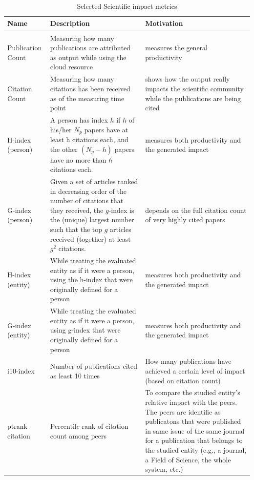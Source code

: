 \documentclass{sig-alternate-05-2015}
\begin{document}
\begin{table}[htb]
\caption{Selected Scientific impact metrics}
\begin{scriptsize}
\label{T:SIMmetrics}
\bigskip
\begin{center}
\begin{tabular}{p{}p{}p{}}
Name & Description & Motivation \\
\hline
\rowcolor{blue!20} \multicolumn{3}{l}{\bf Scientific impact metrics} \\
\hline
Publication Count &
Measuring how many publications are attributed as output while using the cloud 
resource &
measures the general productivity \\
\hline 
Citation Count &
Measuring how many citations has been received as of the measuring time point &
shows how the output really impacts the scientific community while the 
publications are being cited \\
\hline
H-index (person) \cite{hirsch2005index} &
A person has index $h$ if $h$ of his/her $N_p$ papers have at least h
                   citations each, and the other $(N_p − h)$ papers have
                   no more than $h$ citations each. &
 measures both productivity and the generated impact \\
\hline
G-index (person) \cite{egghe2006theory} &
Given a set of articles ranked in decreasing order of the number of citations that they received, the $g$-index is the (unique) largest number such that the top $g$ articles received (together) at least $g^2$ citations.&
depends on the full citation count of very highly cited papers\\
\hline
H-index (entity) &
While treating the evaluated entity as if it were a person, using the
h-index that were originally defined for a person &
measures both productivity and the generated impact \\
\hline
G-index (entity)&
While treating the evaluated entity as if it were a person, using 
g-index that were originally defined for a person &
measures both productivity and the generated impact \\
\hline
i10-index \cite{www-i10index} &
Number of publications cited as least 10 times &
How many publications have achieved a certain level of impact (based on citation count) \\
\hline
ptrank-citation &
Percentile rank of citation count among peers &
To compare the studied entity's relative impact with the peers. The peers are identifie as publicatons that were published in same issue of the same journal for a publication that belongs to the studied entity (e.g., a journal, a Field of Science, the whole system, etc.) \\
\hline
\end{tabular}
\end{center}
\end{scriptsize}
\end{table}
\end{document}
